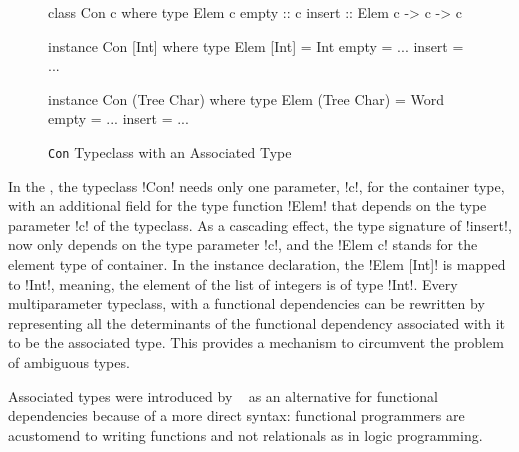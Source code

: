 \documentclass[screen,nonacm,manuscript,review]{acmart} %
\begin{document}
\begin{figure}[ht]
\begin{center}
\begin{minipage}[ht]{0.3\linewidth}
\begin{CenteredBox}
\begin{code}
class Con c where
  type Elem c
  empty :: c
  insert :: Elem c -> c -> c
\end{code}
\end{CenteredBox}
\end{minipage}%
\begin{minipage}[ht]{0.3\linewidth}
\begin{CenteredBox}
\begin{code}
instance Con [Int] where
  type Elem [Int] = Int
  empty = ...
  insert = ...
\end{code}
\end{CenteredBox}
\end{minipage}%
\begin{minipage}[ht]{0.3\linewidth}
\begin{CenteredBox}
\begin{code}
instance Con (Tree Char) where
  type Elem (Tree Char) = Word
  empty = ...
  insert = ...
\end{code}
\end{CenteredBox}
\end{minipage}
\end{center}
\caption[Con typeclass]{\lstinline{Con} Typeclass with an Associated Type}
\label{fig:assoc-types}
\end{figure}

In the , the typeclass !Con! needs only one
parameter, !c!, for the container type, with an additional field for
the type function !Elem! that depends on the type parameter !c! of the
typeclass. As a cascading effect, the type signature of !insert!, now only depends on
the type parameter !c!, and the !Elem c! stands for the element
type of container. In the instance declaration, the !Elem [Int]! is mapped to
!Int!, meaning, the element of the list of integers is of type !Int!.
Every multiparameter typeclass, with a functional dependencies can be
rewritten by representing all the determinants of the functional
dependency associated with it to be the associated type. This provides
a mechanism to circumvent the problem of ambiguous types.

Associated types were introduced by ~\citet{chakravarty_associated_2005}
as an alternative for functional dependencies because of a more
direct syntax: functional programmers are acustomend to writing
functions and not relationals as in logic programming.
\end{document}

